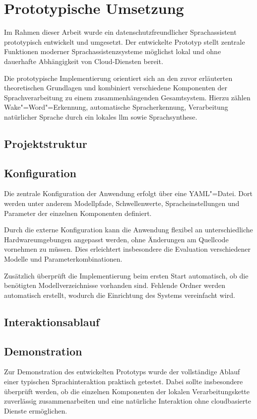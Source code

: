 \chapter{Prototypische Umsetzung}
Im Rahmen dieser Arbeit wurde ein datenschutzfreundlicher Sprachassistent prototypisch entwickelt und umgesetzt. Der entwickelte Prototyp stellt zentrale Funktionen moderner Sprachassistenzsysteme möglichst lokal und ohne dauerhafte Abhängigkeit von Cloud-Diensten bereit.

Die prototypische Implementierung orientiert sich an den zuvor erläuterten theoretischen Grundlagen und kombiniert verschiedene Komponenten der Sprachverarbeitung zu einem zusammenhängenden Gesamtsystem. Hierzu zählen Wake"=Word"=Erkennung, automatische Spracherkennung, Verarbeitung natürlicher Sprache durch ein lokales \gls{llm} sowie Sprachsynthese.


\section{Projektstruktur}



\section{Konfiguration}
Die zentrale Konfiguration der Anwendung erfolgt über eine YAML"=Datei. Dort werden unter anderem Modellpfade, Schwellenwerte, Spracheinstellungen und Parameter der einzelnen Komponenten definiert.

Durch die externe Konfiguration kann die Anwendung flexibel an unterschiedliche Hardwareumgebungen angepasst werden, ohne Änderungen am Quellcode vornehmen zu müssen. Dies erleichtert insbesondere die Evaluation verschiedener Modelle und Parameterkombinationen.

Zusätzlich überprüft die Implementierung beim ersten Start automatisch, ob die benötigten Modellverzeichnisse vorhanden sind. Fehlende Ordner werden automatisch erstellt, wodurch die Einrichtung des Systems vereinfacht wird.


\section{Interaktionsablauf}



\section{Demonstration}
Zur Demonstration des entwickelten Prototyps wurde der vollständige Ablauf einer typischen Sprachinteraktion praktisch getestet. Dabei sollte insbesondere überprüft werden, ob die einzelnen Komponenten der lokalen Verarbeitungskette zuverlässig zusammenarbeiten und eine natürliche Interaktion ohne cloudbasierte Dienste ermöglichen.

